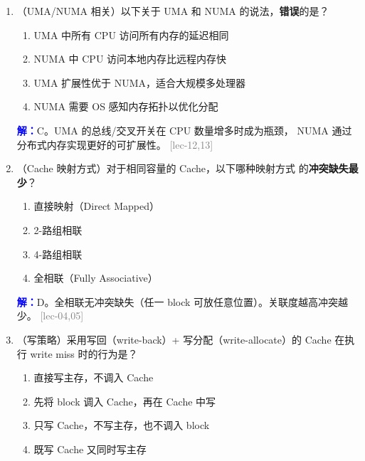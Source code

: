 \documentclass[11pt,a4paper]{article}
\newcommand{\ans}{\par\noindent\textcolor{blue}{\textbf{解：}}}
\newcommand{\lec}[1]{\textcolor{gray}{[lec-#1]}}
\begin{document}
\begin{enumerate}[leftmargin=*,itemsep=8pt]
  \begin{enumerate}[label=\Alph*.]
    \item DMA 需要 CPU 逐字节参与数据搬运
    \item DMA 使外设可直接读写主存，释放 CPU 去干别的
    \item DMA 只能用于磁盘 I/O，不能用于网卡
    \item DMA 传输期间 CPU 必须暂停所有操作
  \end{enumerate}

  \ans B。DMA 控制器在外设和主存间直接搬数据，CPU 只在启动和结束时介入。
  可用于磁盘、网卡、显卡等任何需要批量传输的外设。 \lec{13}

\item （UMA/NUMA 相关）以下关于 UMA 和 NUMA 的说法，\textbf{错误}的是？

  \begin{enumerate}[label=\Alph*.]
    \item UMA 中所有 CPU 访问所有内存的延迟相同
    \item NUMA 中 CPU 访问本地内存比远程内存快
    \item UMA 扩展性优于 NUMA，适合大规模多处理器
    \item NUMA 需要 OS 感知内存拓扑以优化分配
  \end{enumerate}

  \ans C。UMA 的总线/交叉开关在 CPU 数量增多时成为瓶颈，
  NUMA 通过分布式内存实现更好的可扩展性。 \lec{12,13}

\item （Cache 映射方式）对于相同容量的 Cache，以下哪种映射方式
  的\textbf{冲突缺失最少}？

  \begin{enumerate}[label=\Alph*.]
    \item 直接映射（Direct Mapped）
    \item 2-路组相联
    \item 4-路组相联
    \item 全相联（Fully Associative）
  \end{enumerate}

  \ans D。全相联无冲突缺失（任一 block 可放任意位置）。关联度越高冲突越少。 \lec{04,05}

\item （写策略）采用写回（write-back）+ 写分配（write-allocate）的 Cache
  在执行 write miss 时的行为是？

  \begin{enumerate}[label=\Alph*.]
    \item 直接写主存，不调入 Cache
    \item 先将 block 调入 Cache，再在 Cache 中写
    \item 只写 Cache，不写主存，也不调入 block
    \item 既写 Cache 又同时写主存
  \end{enumerate}


\end{enumerate}
\end{document}
